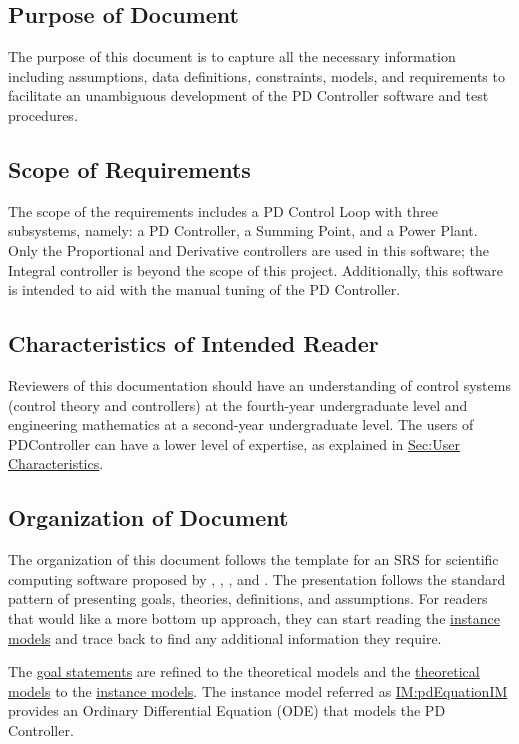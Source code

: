 \documentclass[12pt]{article}
\begin{document}
\subsection{Purpose of Document}
\label{Sec:DocPurpose}
The purpose of this document is to capture all the necessary information including assumptions, data definitions, constraints, models, and requirements to facilitate an unambiguous development of the PD Controller software and test procedures.

\subsection{Scope of Requirements}
\label{Sec:ReqsScope}
The scope of the requirements includes a PD Control Loop with three subsystems, namely: a PD Controller, a Summing Point, and a Power Plant. Only the Proportional and Derivative controllers are used in this software; the Integral controller is beyond the scope of this project. Additionally, this software is intended to aid with the manual tuning of the PD Controller.

\subsection{Characteristics of Intended Reader}
\label{Sec:ReaderChars}
Reviewers of this documentation should have an understanding of control systems (control theory and controllers) at the fourth-year undergraduate level and engineering mathematics at a second-year undergraduate level. The users of PDController can have a lower level of expertise, as explained in \hyperref[Sec:UserChars]{Sec:User Characteristics}.

\subsection{Organization of Document}
\label{Sec:DocOrg}
The organization of this document follows the template for an SRS for scientific computing software proposed by \cite{koothoor2013}, \cite{smithLai2005}, \cite{smithEtAl2007}, and \cite{smithKoothoor2016}. The presentation follows the standard pattern of presenting goals, theories, definitions, and assumptions. For readers that would like a more bottom up approach, they can start reading the \hyperref[Sec:IMs]{instance models} and trace back to find any additional information they require.

The \hyperref[Sec:GoalStmt]{goal statements} are refined to the theoretical models and the \hyperref[Sec:TMs]{theoretical models} to the \hyperref[Sec:IMs]{instance models}. The instance model referred as \hyperref[IM:pdEquationIM]{IM:pdEquationIM} provides an Ordinary Differential Equation (ODE) that models the PD Controller.
\end{document}
